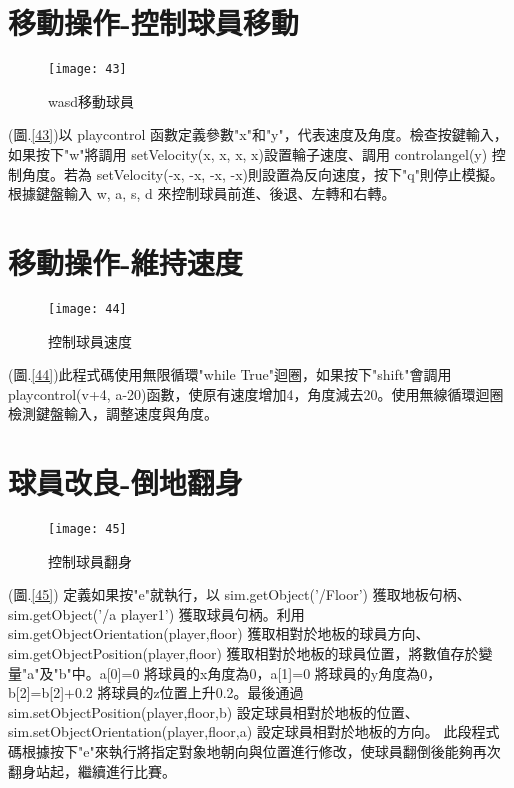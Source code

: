 \section{移動操作-控制球員移動}
\begin{figure}[hbt!]
\begin{center}
\texttt{[image: 43]}
\caption{\Large wasd移動球員}\label{fig.43}
\end{center}
\end{figure}
(圖.\ref{43})以 playcontrol 函數定義參數"x"和"y"，代表速度及角度。檢查按鍵輸入，如果按下"w"將調用 setVelocity(x, x, x, x)設置輪子速度、調用 controlangel(y) 控制角度。若為 setVelocity(-x, -x, -x, -x)則設置為反向速度，按下"q"則停止模擬。\\
  根據鍵盤輸入 w, a, s, d 來控制球員前進、後退、左轉和右轉。\\
\newpage
\section{移動操作-維持速度}
\begin{figure}[hbt!]
\begin{center}
\texttt{[image: 44]}
\caption{\Large 控制球員速度}\label{fig.44}
\end{center}
\end{figure}
(圖.\ref{44})此程式碼使用無限循環"while True"迴圈，如果按下"shift"會調用 playcontrol(v+4, a-20)函數，使原有速度增加4，角度減去20。使用無線循環迴圈檢測鍵盤輸入，調整速度與角度。\\
\section{球員改良-倒地翻身}
\begin{figure}[hbt!]
\begin{center}
\texttt{[image: 45]}
\caption{\Large 控制球員翻身}\label{fig.45}
\end{center}
\end{figure}
(圖.\ref{45}) 定義如果按"e"就執行，以 sim.getObject('/Floor') 獲取地板句柄、sim.getObject('/a player1') 獲取球員句柄。利用 sim.getObjectOrientation(player,floor) 獲取相對於地板的球員方向、sim.getObjectPosition(player,floor) 獲取相對於地板的球員位置，將數值存於變量"a"及"b"中。a[0]=0 將球員的x角度為0，a[1]=0 將球員的y角度為0，b[2]=b[2]+0.2 將球員的z位置上升0.2。最後通過 sim.setObjectPosition(player,floor,b) 設定球員相對於地板的位置、sim.setObjectOrientation(player,floor,a) 設定球員相對於地板的方向。
  此段程式碼根據按下"e"來執行將指定對象地朝向與位置進行修改，使球員翻倒後能夠再次翻身站起，繼續進行比賽。



